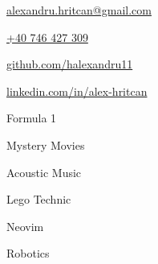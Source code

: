 \documentclass[11pt]{spidercv}
\begin{document}
\begin{TopBar}{\ColorTextSide}

	\begin{DoubleColumns}
		\begin{ItemList}{\ColorHighlight}
			\item [\Large\faAt] \href{mailto:alexandru.hritcan@gmail.com}{alexandru.hritcan@gmail.com}
      \item [\Large\faMobile] \href{tel:+40746427309}{+40 746 427 309}
		\end{ItemList}
		\nextcolumn
		\begin{ItemList}{\ColorHighlight}
			\item [\Large\faGithub] \href{https://github.com/halexandru11}{github.com/halexandru11}
			\item [\Large\faLinkedinSquare] \href{https://www.linkedin.com/in/alex-hritcan}{linkedin.com/in/alex-hritcan}
		\end{ItemList}
	\end{DoubleColumns}

	\begin{TripleColumns}
		\begin{ItemList}{\ColorHighlight}
			\item [] Formula 1
		\end{ItemList}
		\nextcolumn
		\begin{ItemList}{\ColorHighlight}
			\item [] Mystery Movies
    \end{ItemList}
		\nextcolumn
		\begin{ItemList}{\ColorHighlight}
			\item [] Acoustic Music
		\end{ItemList}
	\end{TripleColumns}
	\begin{TripleColumns}
		\begin{ItemList}{\ColorHighlight}
			\item [] Lego Technic
		\end{ItemList}
		\nextcolumn
		\begin{ItemList}{\ColorHighlight}
			\item [] Neovim
    \end{ItemList}
		\nextcolumn
		\begin{ItemList}{\ColorHighlight}
			\item [] Robotics
		\end{ItemList}
	\end{TripleColumns}
\end{TopBar}
\end{document}
